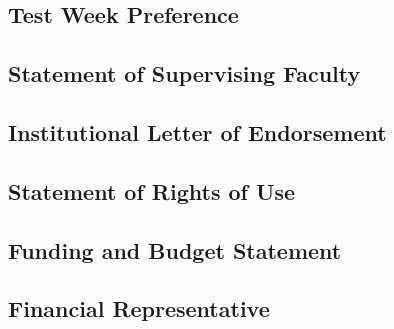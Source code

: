 \documentclass{article}
\begin{document}
\subsection{Test Week Preference}
\subsection{Statement of Supervising Faculty}
\subsection{Institutional Letter of Endorsement}
\subsection{Statement of Rights of Use}
\subsection{Funding and Budget Statement}
\subsection{Financial Representative}
\end{document}
